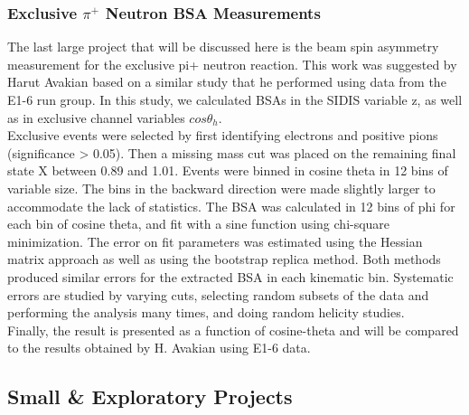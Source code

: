 \subsubsection{Exclusive $\pi^+$ Neutron BSA Measurements}

The last large project that will be discussed here is the beam spin asymmetry measurement for the exclusive pi+ neutron reaction.  This work was suggested by Harut Avakian based on a similar study that he performed using data from the E1-6 run group.  In this study, we calculated BSAs in the SIDIS variable z, as well as in exclusive channel variables $cos\theta_h$.  \\

Exclusive events were selected by first identifying electrons and positive pions (significance > 0.05).  Then a missing mass cut was placed on the remaining final state X between 0.89 and 1.01.  Events were binned in cosine theta in 12 bins of variable size.  The bins in the backward direction were made slightly larger to accommodate the lack of statistics.  The BSA was calculated in 12 bins of phi for each bin of cosine theta, and fit with a sine function using chi-square minimization.  The error on fit parameters was estimated using the Hessian matrix approach as well as using the bootstrap replica method.  Both methods produced similar errors for the extracted BSA in each kinematic bin.  Systematic errors are studied by varying cuts, selecting random subsets of the data and performing the analysis many times, and doing random helicity studies.  \\

Finally, the result is presented as a function of cosine-theta and will be compared to the results obtained by H. Avakian using E1-6 data. 

\subsection{Small \& Exploratory Projects}
